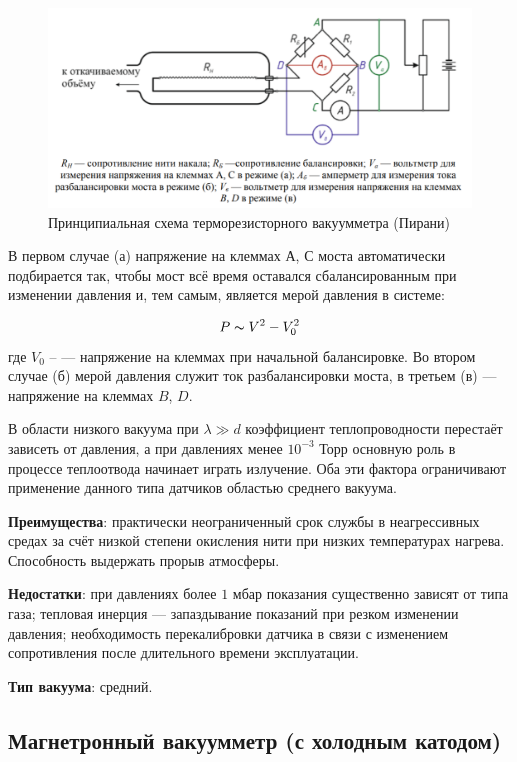 \documentclass[a4paper, 12pt]{article} %
\begin{document}
\begin{figure}[h]
    \centering
    \includegraphics[width = 13 cm]{Пирани}
    \caption{Принципиальная схема терморезисторного вакуумметра (Пирани)}
    \label{fig:vac}
\end{figure}

В первом случае (а) напряжение на клеммах $А$, $С$ моста автоматически подбирается так, чтобы мост всё время оставался сбалансированным при изменении давления и, тем самым, является мерой давления в системе: 

\begin{equation}
    P \thicksim V^2 - V_{0}^2
\end{equation}
где $V_0$ -- — напряжение на клеммах при начальной балансировке.
Во втором случае (б) мерой давления служит ток разбалансировки моста, в третьем (в) — напряжение на клеммах $B$, $D$. 

В области низкого вакуума при $\lambda \gg d$ коэффициент теплопроводности перестаёт зависеть от давления, а при давлениях менее $10^{-3}$ Торр
основную роль в процессе теплоотвода начинает играть излучение. Оба эти фактора ограничивают применение данного типа датчиков областью среднего вакуума.

\textbf{Преимущества}: практически неограниченный срок службы
в неагрессивных средах за счёт низкой степени окисления нити
при низких температурах нагрева. Способность выдержать прорыв атмосферы.

\textbf{Недостатки}: при давлениях более $1$ мбар показания существенно
зависят от типа газа; тепловая инерция — запаздывание показаний при резком изменении давления; необходимость перекалибровки датчика в связи с изменением сопротивления после длительного времени эксплуатации.

\textbf{Тип вакуума}: средний.

\subsection{Магнетронный вакуумметр (с холодным катодом)}
\end{document}
